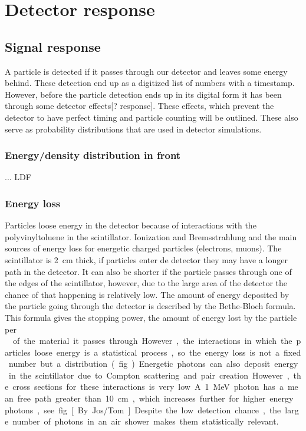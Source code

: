 \chapter{Detector response}

\section{Signal response}

A particle is detected if it passes through our detector and leaves some
energy behind. These detection end up as a digitized list of numbers
with a timestamp. However, before the particle detection ends up in its
digital form it has been through some detector effects[? response].
These effects, which prevent the detector to have perfect timing and
particle counting will be outlined. These also serve as probability distributions that are used in detector simulations.


\subsection{Energy/density distribution in front}

... LDF


\subsection{Energy loss}

Particles loose energy in the detector because of interactions with the
polyvinyltoluene in the scintillator. Ionization and Bremsstrahlung and
the main sources of energy loss for energetic charged particles
(electrons, muons). The scintillator is \SI{2}{\centi\meter} thick, if
particles enter de detector they may have a longer path in the detector.
It can also be shorter if the particle passes through one of the edges
of the scintillator, however, due to the large area of the detector the
chance of that happening is relatively low. The amount of energy
deposited by the particle going through the detector is described by the
Bethe-Bloch formula. This formula gives the stopping power, the amount
of energy lost by the particle per \SI{}{\gram\centi\meter\square} of
the material it passes through. However, the interactions in which the
particles loose energy is a statistical process, so the energy loss is
not a fixed number but a distribution. (fig...)

Energetic photons can also deposit energy in the scintillator due to
Compton scattering and pair creation. However, the cross sections for
these interactions is very low. A \SI{1}{\mega\electronvolt} photon  has
a mean free path greater than \SI{10}{\centi\meter}, which increases
further for higher energy photons, see fig [By Jos/Tom]. Despite the low
detection chance, the large number of photons in an air shower makes
them statistically relevant.


